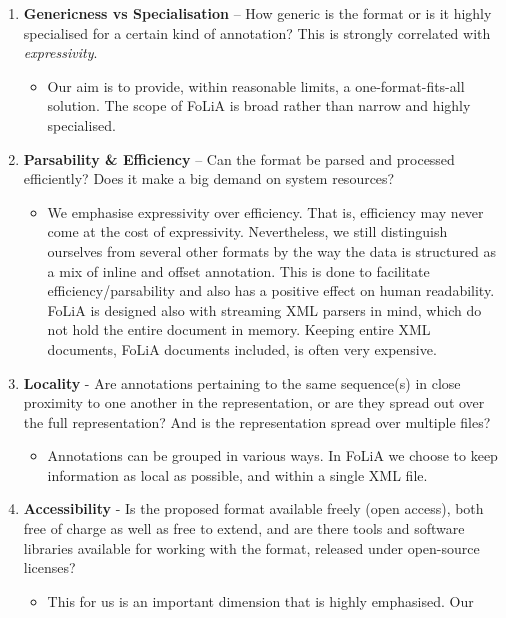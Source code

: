 \documentclass[a4paper,10pt,twoside]{article}
\begin{document}
\begin{enumerate}
\setcounter{enumi}{\theenumTemp}
\item \textbf{Genericness vs Specialisation} -- How generic is the format or is it highly specialised
  for a certain kind of annotation? This is strongly correlated with
  \emph{expressivity}.
  \begin{itemize}
    \item[] Our aim is to provide, within reasonable limits, a
      one-format-fits-all solution. The scope of FoLiA is broad rather than
      narrow and highly specialised.
   \end{itemize}
\item \textbf{Parsability \& Efficiency} -- Can the format be parsed and
  processed efficiently? Does it make a big demand on system resources?
  \begin{itemize}
    \item[] We emphasise expressivity over efficiency. That is, efficiency may
      never come at the cost of expressivity. Nevertheless, we still
      distinguish ourselves from several other formats by the way the data is
      structured as a mix of inline and offset annotation. This is done to
      facilitate efficiency/parsability and also has a positive effect on human
      readability. FoLiA is designed also with streaming XML parsers in mind,
      which do not hold the entire document in memory. Keeping entire XML
      documents, FoLiA documents included, is often very expensive.
  \end{itemize}
\item \textbf{Locality} - Are annotations pertaining to the same sequence(s) in
  close proximity to one another in the representation, or are they spread out
  over the full representation? And is the representation spread over multiple
  files?
  \begin{itemize}
    \item[] Annotations can be grouped in various ways. In FoLiA we choose to
      keep information as local as possible, and within a single XML file.
  \end{itemize}
\item \textbf{Accessibility} - Is the proposed format available freely (open
  access), both free of charge as well as free to extend, and are there tools and
  software libraries available for working with the format, released under
  open-source licenses? 
  \begin{itemize}
    \item[] This for us is an important dimension that is highly emphasised. Our

\end{itemize}
\end{enumerate}
\end{document}
